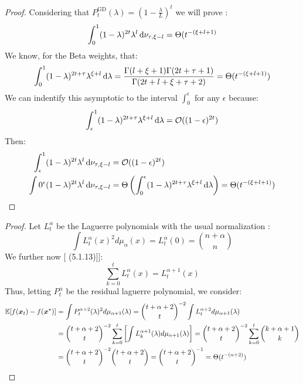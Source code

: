 \documentclass{article}
\begin{document}
\gdrates*
\begin{proof}
Considering that $P_t^\text{GD}(\lambda)=(1-\frac{\lambda}{L})^t$ we will prove :
\begin{equation}
    \int_0^1(1-\lambda)^{2t}\lambda^l\mathop{}\!\mathrm{d}\nu_{\tau,\xi-l}=\Theta(t^{-(\xi+l+1)}
\end{equation}
We know, for the Beta weights, that:
\begin{equation}
    \int_0^1(1-\lambda)^{2t+\tau}\lambda^{\xi+l}\mathop{}\!\mathrm{d}\lambda=\frac{\Gamma(l+\xi+1)\Gamma(2t+\tau+1)}{\Gamma(2t+l+\xi+\tau+2)}=\Theta(t^{-(\xi+l+1)})
\end{equation}
We can indentify this asymptotic to the interval $\int_0^\epsilon$ for any $\epsilon$ because:
\begin{equation}
    \int_\epsilon^1(1-\lambda)^{2t+\tau}\lambda^{\xi+l}\mathop{}\!\mathrm{d}\lambda=\mathcal{O}((1-\epsilon)^{2t})
\end{equation}
Then:
\begin{align}
    \int_\epsilon^1(1-\lambda)^{2t}\lambda^l\mathop{}\!\mathrm{d}\nu_{\tau,\xi-l}&=\mathcal{O}((1-\epsilon)^{2t}) \\
    \int0^\epsilon(1-\lambda)^{2t}\lambda^l\mathop{}\!\mathrm{d}\nu_{\tau,\xi-l}&=\Theta\left(\int_0^\epsilon(1-\lambda)^{2t+\tau}\lambda^{\xi+l}\mathop{}\!\mathrm{d}\lambda\right)=\Theta(t^{-(\xi+l+1)})
\end{align}

\end{proof}
\laguerrerates*
\begin{proof}
Let $L_t^\alpha$ be the Laguerre polynomials with the usual normalization \cite{szego1975orthogonal}:
\begin{equation}
    \int L_t^\alpha(x)^2d\mu_\alpha(x)=L_t^\alpha(0)=\binom{n+\alpha}{n} 
\end{equation}
We further now [\cite{szego1975orthogonal} (5.1.13)]]:
\begin{equation}
    \sum_{k=0}^tL_t^\alpha(x)=L_t^{\alpha+1}(x)
\end{equation}
Thus, letting $P_t^\alpha$ be the residual laguerre polynomial, we consider:
\begin{equation}
\begin{split}
    {\mathbb{E}}[f({\boldsymbol x}_t)-f({\boldsymbol x}^\star)]&=\int P_t^{\alpha+2}(\lambda)^2d\mu_{\alpha+1}(\lambda)=\binom{t+\alpha+2}{t}^{-2}\int L_t^{\alpha+2}d\mu_{\alpha+1}(\lambda)\\
    &=\binom{t+\alpha+2}{t}^{-2}\sum_{k=0}^{t}\left[\int L_k^{\alpha+1}(\lambda)d\mu_{\alpha+1}(\lambda)\right]=\binom{t+\alpha+2}{t}^{-2}\sum_{k=0}^t\binom{k+\alpha+1}{k}\\
    &=\binom{t+\alpha+2}{t}^{-2}\binom{t+\alpha+2}{t}=\binom{t+\alpha+2}{t}^{-1}=\Theta( t^{-(\alpha+2)})
\end{split}
\end{equation}
\end{proof}
\end{document}
